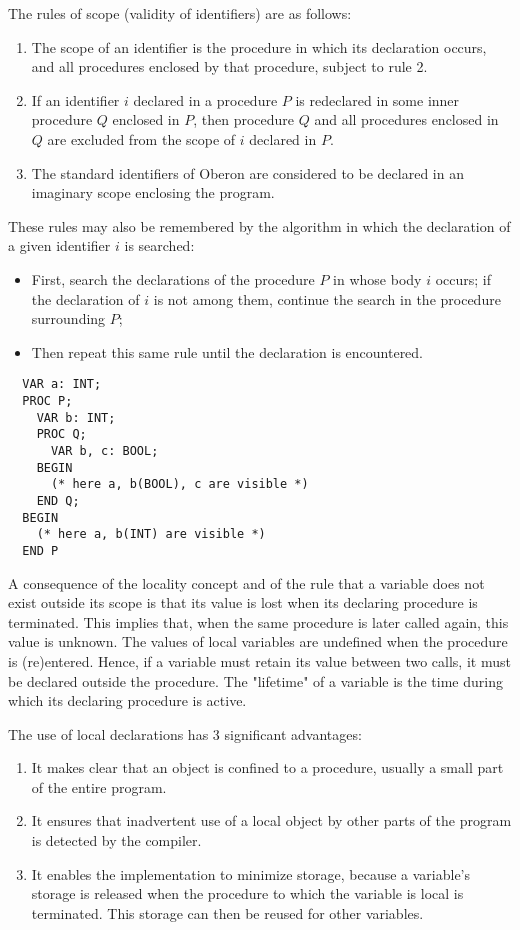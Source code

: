 The rules of scope (validity of identifiers) are as follows:
\begin{enumerate}
  \item The scope of an identifier is the procedure in which its declaration occurs, and all
    procedures enclosed by that procedure, subject to rule 2.
  \item If an identifier $i$ declared in a procedure $P$ is redeclared in some inner procedure $Q$
    enclosed in $P$, then procedure $Q$ and all procedures enclosed in $Q$ are excluded from the
    scope of $i$ declared in $P$.
  \item The standard identifiers of Oberon are considered to be declared in an imaginary scope
    enclosing the program.
\end{enumerate}
These rules may also be remembered by the algorithm in which the declaration of a given identifier
$i$ is searched:
\begin{itemize}
  \item[] First, search the declarations of the procedure $P$ in whose body $i$ occurs; if the
    declaration of $i$ is not among them, continue the search in the procedure surrounding $P$;
  \item[] Then repeat this same rule until the declaration is encountered.
\end{itemize}
\begin{verbatim}
  VAR a: INT;
  PROC P;
    VAR b: INT;
    PROC Q;
      VAR b, c: BOOL;
    BEGIN
      (* here a, b(BOOL), c are visible *)
    END Q;
  BEGIN
    (* here a, b(INT) are visible *)
  END P
\end{verbatim}

A consequence of the locality concept and of the rule that a variable does not exist outside its
scope is that its value is lost when its declaring procedure is terminated. This implies that, when the
same procedure is later called again, this value is unknown. The values of local variables are
undefined when the procedure is (re)entered. Hence, if a variable must retain its value between two
calls, it must be declared outside the procedure. The "lifetime" of a variable is the time during which
its declaring procedure is active.

The use of local declarations has 3 significant advantages:
\begin{enumerate}
  \item It makes clear that an object is confined to a procedure, usually a small part of the entire
    program.
  \item It ensures that inadvertent use of a local object by other parts of the program is detected
    by the compiler.
  \item It enables the implementation to minimize storage, because a variable's storage is released
    when the procedure to which the variable is local is terminated. This storage can then be reused
    for other variables.
\end{enumerate}
